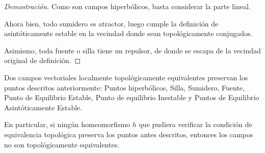 \begin{proof}[Demostración]
	Como son campos hiperbólicos, basta considerar la parte lineal. 
	
	Ahora bien, todo sumidero es atractor, luego cumple la definición de asintóticamente estable en la vecindad donde sean topológicamente conjugados.
	
	Asimismo,  toda fuente o silla tiene un repulsor, de donde se escapa de la vecindad original de definición.
\end{proof}


\begin{thm}
	Dos campos vectoriales localmente topológicamente equivalentes preservan los puntos descritos anteriormente: Puntos hiperbólicos, Silla, Sumidero, Fuente, Punto de Equilibrio Estable, Punto de equilibrio Inestable y Puntos de Equilibrio Asintóticamente Estable.
	
	En particular, si ningún homeomorfismo $h$ que pudiera verificar la condición de equivalencia topológica preserva los puntos antes descritos, entonces los campos no son topológicamente equivalentes.
\end{thm}

